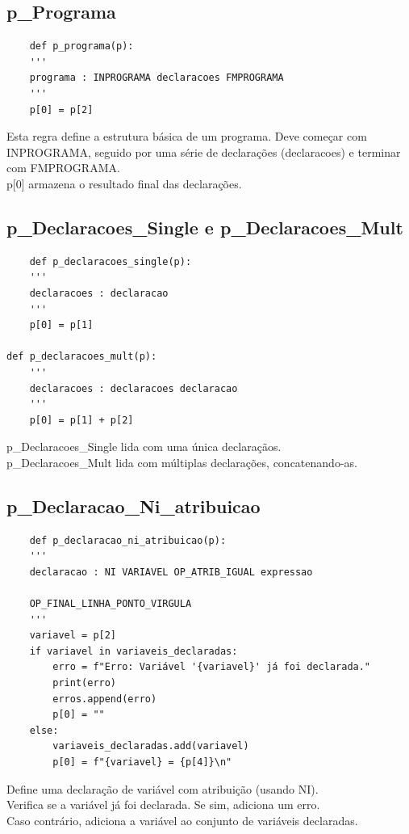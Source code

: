 \documentclass[a4paper,12pt]{article}
\begin{document}
\subsection{p\_Programa}
\begin{verbatim}
    def p_programa(p):
    '''
    programa : INPROGRAMA declaracoes FMPROGRAMA
    '''
    p[0] = p[2]
\end{verbatim}
Esta regra define a estrutura básica de um programa. Deve começar com 
INPROGRAMA, seguido por uma série de declarações (declaracoes) e 
terminar com FMPROGRAMA.\\

p[0] armazena o resultado final das declarações.

\subsection{p\_Declaracoes\_Single e p\_Declaracoes\_Mult}
\begin{verbatim}
    def p_declaracoes_single(p):
    '''
    declaracoes : declaracao
    '''
    p[0] = p[1]

def p_declaracoes_mult(p):
    '''
    declaracoes : declaracoes declaracao
    '''
    p[0] = p[1] + p[2]
\end{verbatim}
p\_Declaracoes\_Single lida com uma única declaraçãos.\\
p\_Declaracoes\_Mult lida com múltiplas declarações, concatenando-as.

\subsection{p\_Declaracao\_Ni\_atribuicao}
\begin{verbatim}
    def p_declaracao_ni_atribuicao(p):
    '''
    declaracao : NI VARIAVEL OP_ATRIB_IGUAL expressao 
    
    OP_FINAL_LINHA_PONTO_VIRGULA
    '''
    variavel = p[2]
    if variavel in variaveis_declaradas:
        erro = f"Erro: Variável '{variavel}' já foi declarada."
        print(erro)
        erros.append(erro)
        p[0] = ""
    else:
        variaveis_declaradas.add(variavel)
        p[0] = f"{variavel} = {p[4]}\n"
\end{verbatim}
Define uma declaração de variável com atribuição (usando NI).\\
Verifica se a variável já foi declarada. Se sim, adiciona um erro.\\
Caso contrário, adiciona a variável ao conjunto de variáveis declaradas.
\end{document}
